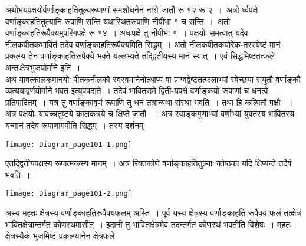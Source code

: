 \documentclass[11pt, openany]{book}
\begin{document}
\newpage

\begin{sloppypar}
अथोभयपक्षयोर्वर्णाङ्काहतितुल्यरूपाणां समशोधनेन नाशे जातौ रू १२ रू २~।~अत्रो-र्ध्वपक्षे वर्णाङ्काहतितुल्यानि रूपाणि सन्ति यथास्थितरूपाणि नीपीभा १ च सन्ति~।~अतो वर्णाङ्काहतिरूपैक्यमुपरिगपक्षे रू १४~। अधःपक्षे तु नीपीभा १~। पक्षयोः समत्वात् यदेव नीलकपीतकभावितं तदेव वर्णाङ्काहतिरूपैक्यमिति सिद्धम्~। अतो नीलकपीतकयोरेक-तरस्येष्टं मानं प्रकल्प्य तेन वर्णाङ्काहतिरूपैक्ये भक्ते यल्लभ्यते तद्द्वितीयस्य मानं स्यात्~। एवं सिद्धमिष्टतत्फले अन्तःक्षेत्रभुजयोर्माने इति~।\\

अथ यावत्कालकमानयोः पीतकनीलकौ स्वस्वमानेनोत्थाप्य वा प्राग्वद्वेष्टतत्फलाभ्यां स्वेच्छया संयुतौ वर्णाङ्कौ व्यत्ययाद्वर्णयोर्माने भवत इत्युपपद्यते~। तदेवं भावितसमे द्विती-यपक्षे वर्णाङ्कयो रूपाणां च धनत्वे प्रतिपादितम्~। यत्र तु वर्णाङ्कावृणं रूपाणि तु धनं तत्रान्यथा संस्था भवति~। तथा हि कल्पितौ पक्षौ ~। अत्र पक्षयोः यावच्चतुष्टये कालकत्रये च क्षिप्ते जातौ ~। अत्र स्वाङ्कगुणाभ्यां वर्णाभ्यां युक्तस्य भावितस्य यन्मानं तदेव रूपाणामपीति सिद्धम्~। तस्य दर्शनम् 

\begin{center}
\texttt{[image: Diagram\_page101-1.png]}
\end{center}

एतद्द्वितीयपक्षस्य रूपात्मकस्य मानम्~। अत्र रिक्तकोणे वर्णाङ्काहतितुल्याः कोष्ठका यदि क्षिप्यन्ते तदैवं भवति~।

\begin{center}
\texttt{[image: Diagram\_page101-2.png]}
\end{center}

अस्य महतः क्षेत्रस्य वर्णाङ्काहतिरूपैक्यफलम् अस्ति~। पूर्वं यस्य क्षेत्रस्य वर्णाङ्काहति-रूपैक्यं फलं तत्क्षेत्रं भावितक्षेत्रान्तर्गतं कोणस्थमासीत्~। इदानीं तु भावितक्षेत्रमेव तदन्तर्गतं कोणस्थं भवतीति विशेषः~। महतः क्षेत्रस्यैकं भुजमिष्टं प्रकल्प्यानेन क्षेत्रफले
\end{sloppypar}
\end{document}
